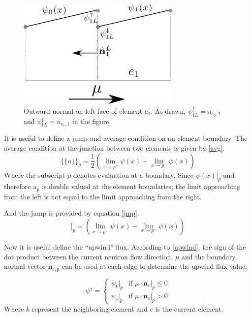 \begin{figure}[!htbp]
\centering
\includegraphics[width=8cm]{images/bound_norm.png}
\caption{Outward normal on left face of element $e_1$. As drawn, $\psi_{1L}^{\uparrow}=u_{e_0, 2}$ and $\psi_{1L}^{\downarrow}=u_{e_1, 1}$ in the figure.}
\label{bound_norm}
\end{figure}

It is useful to define a jump and average condition on an element boundary.
The average condition at the junction between two elements is given by \ref{avg}.
\begin{equation}
\{\{u\}\}_p = \frac{1}{2} (\lim_{x \to p^+} \psi(x) + \lim_{x \to p^-} \psi(x))
\label{avg}
\end{equation}
Where the subscript $p$ denotes evaluation at a boundary. Since $\psi(x)|_p$ and therefore $u_p$ is double valued at the element boundaries; the limit approaching from the left is not equal to the limit approaching from the right.

And the jump is provided by equation \ref{jmp}.
\begin{equation}
[[u]]_p =  (\lim_{x \to p^+} \psi(x) - \lim_{x \to p^-} \psi(x))
\label{jmp}
\end{equation}

Now it is useful define the ``upwind'' flux.  According to \ref{upwind}, the sign of the dot product between the current neutron flow direction, $\mu$ and the boundary normal vector $\mathbf n_{e,p}$ can be used at each edge to determine the upwind flux value.

\begin{equation}
\psi^{\uparrow} = 
  \begin{cases}
      \psi_k|_p & \text{if $\mu \cdot \mathbf n_e|_p \leq 0$} \\
      \psi_e|_p & \text{if $\mu \cdot \mathbf n_e|_p > 0$} 
  \end{cases}
\label{upwind}
\end{equation}
Where $k$ represent the neighboring element and $e$ is the current element.

